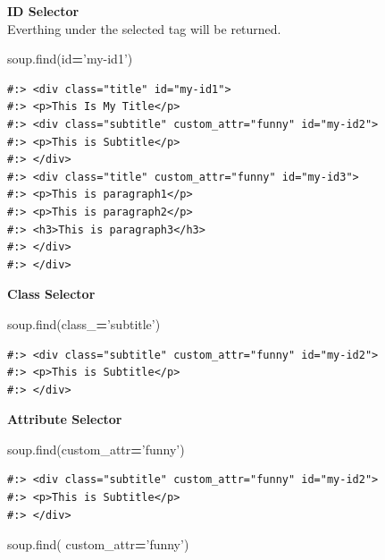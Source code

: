 \documentclass[
]{book}
\newenvironment{Shaded}{\begin{snugshade}}{\end{snugshade}}
\newcommand{\BuiltInTok}[1]{#1}
\newcommand{\NormalTok}[1]{#1}
\newcommand{\OperatorTok}[1]{\textcolor[rgb]{0.43,0.43,0.43}{\textbf{#1}}}
\newcommand{\StringTok}[1]{\textcolor[rgb]{0.5,0.5,0.5}{#1}}
\begin{document}
\textbf{ID Selector}\\
Everthing under the selected tag will be returned.

\begin{Shaded}
\begin{Highlighting}[]
\NormalTok{soup.find(}\BuiltInTok{id}\OperatorTok{=}\StringTok{'my-id1'}\NormalTok{)}
\end{Highlighting}
\end{Shaded}

\begin{verbatim}
#:> <div class="title" id="my-id1">
#:> <p>This Is My Title</p>
#:> <div class="subtitle" custom_attr="funny" id="my-id2">
#:> <p>This is Subtitle</p>
#:> </div>
#:> <div class="title" custom_attr="funny" id="my-id3">
#:> <p>This is paragraph1</p>
#:> <p>This is paragraph2</p>
#:> <h3>This is paragraph3</h3>
#:> </div>
#:> </div>
\end{verbatim}

\textbf{Class Selector}

\begin{Shaded}
\begin{Highlighting}[]
\NormalTok{soup.find(class_}\OperatorTok{=}\StringTok{'subtitle'}\NormalTok{)}
\end{Highlighting}
\end{Shaded}

\begin{verbatim}
#:> <div class="subtitle" custom_attr="funny" id="my-id2">
#:> <p>This is Subtitle</p>
#:> </div>
\end{verbatim}

\textbf{Attribute Selector}

\begin{Shaded}
\begin{Highlighting}[]
\NormalTok{soup.find(custom_attr}\OperatorTok{=}\StringTok{'funny'}\NormalTok{)}
\end{Highlighting}
\end{Shaded}

\begin{verbatim}
#:> <div class="subtitle" custom_attr="funny" id="my-id2">
#:> <p>This is Subtitle</p>
#:> </div>
\end{verbatim}

\begin{Shaded}
\begin{Highlighting}[]
\NormalTok{soup.find(       custom_attr}\OperatorTok{=}\StringTok{'funny'}\NormalTok{)}
\end{Highlighting}
\end{Shaded}
\end{document}
